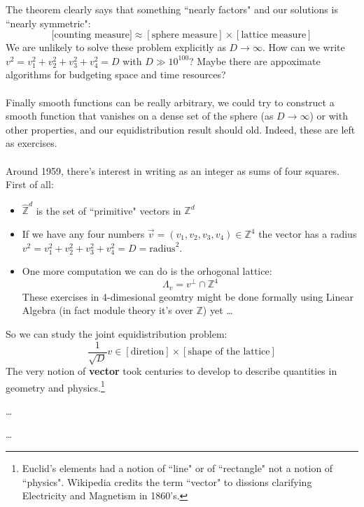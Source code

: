 \documentclass[12pt]{article}
\begin{document}
{The theorem clearly says that something ``nearly factors" and our solutions is ``nearly symmetric":
$$[\text{counting measure]} \approx [\text{sphere measure}] \times [\text{lattice measure}] $$
We are unlikely to solve these problem explicitly as $D \to \infty$.  How can we write $v^2 = v_1^2 + v_2^2 + v_3^2 + v_4^2 = D$ with $D \gg 10^{100}$?  Maybe there are appoximate algorithms for budgeting space and time resources? \\ \\
Finally smooth functions can be really arbitrary, we could try to construct a smooth function that vanishes on a dense set of the sphere (as $D \to \infty$) or with other properties, and our equidistribution result should old.  Indeed, these are left as exercises. \\ \\
Around 1959, there's interest in writing as an integer as sums of four squares.  First of all:
\begin{itemize}
\item $\widehat{\mathbb{Z}}^d$ is the set of ``primitive" vectors in $\mathbb{Z}^d$
\item If we have any four numbers $\vec{v} = (v_1, v_2, v_3, v_4) \in \mathbb{Z}^4 $ the vector has a radius $v^2 = v_1^2 + v_2^2 + v_3^2 + v_4^2 = D = \text{radius}^2$.
\item One more computation we can do is the orhogonal lattice: $$\Lambda_v =v^\perp \cap \mathbb{Z}^4 $$
These exercises in 4-dimesional geomtry might be done formally using Linear Algebra (in fact module theory it's over $\mathbb{Z}$) yet \dots 
\end{itemize}
So we can study the joint equidistribution problem:
$$ \frac{1}{\sqrt{D}} v \in  [\text{diretion}] \times [\text{shape of the lattice}] $$
The very notion of \textbf{vector} took centuries to develop to describe quantities in geometry and physics.\footnote{Euclid's elements had a notion of ``line" or of ``rectangle" not a notion of ``physics".  Wikipedia credits the term ``vector" to dissions clarifying Electricity and Magnetism in 1860's.}
\vfill

\begin{thebibliography}{}

\item \dots
\item \dots 

\end{thebibliography}

\newpage

}
\end{document}
